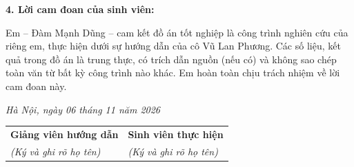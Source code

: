 \vspace{0.12cm}
\noindent \textbf{4. Lời cam đoan của sinh viên:}
\vspace{0.04cm}

Em -- Đàm Mạnh Dũng -- cam kết đồ án tốt nghiệp là công trình nghiên cứu của riêng em, thực hiện dưới sự hướng dẫn của cô Vũ Lan Phương. Các số liệu, kết quả trong đồ án là trung thực, có trích dẫn nguồn (nếu có) và không sao chép toàn văn từ bất kỳ công trình nào khác. Em hoàn toàn chịu trách nhiệm về lời cam đoan này.

\vspace{0.15cm}
\hfill \textit{Hà Nội, ngày 06 tháng 11 năm 2026}
\vspace{0.10cm}

\begin{center}
\begin{tabularx}{\textwidth}{@{}>{\centering\arraybackslash}X >{\centering\arraybackslash}X@{}}
  \textbf{Giảng viên hướng dẫn} & \textbf{Sinh viên thực hiện} \\[0.06cm]
  \textit{(Ký và ghi rõ họ tên)} & \textit{(Ký và ghi rõ họ tên)} \\[2.0cm]
\end{tabularx}
\end{center}
